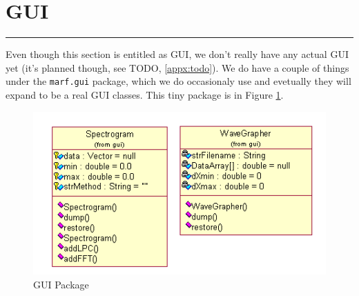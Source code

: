 \section{GUI}
\noindent
\rule{7.0in}{.013in}

Even though this section is entitled as GUI, we don't
really have any actual GUI yet (it's planned though,
see TODO, \ref{appx:todo}). We do have a couple
of things under the \verb+marf.gui+ package, which we do
occasionaly use and evetually they will expand to be a real
GUI classes. This tiny package is in Figure \ref{fig:gui}.

\begin{figure}
	\centering
	\includegraphics{../graphics/arch/gui.png}
	\caption{GUI Package}
	\label{fig:gui}
\end{figure}




